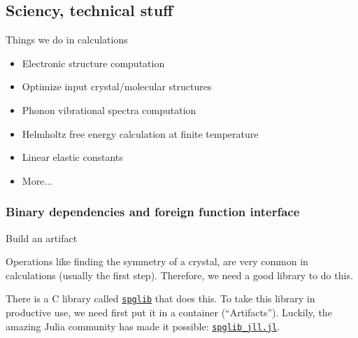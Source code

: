 \subsection{Sciency, technical stuff}

\begin{frame}{Things we do in \ab{} calculations}
    \begin{itemize}
        \item Electronic structure computation
        \item Optimize input crystal/molecular structures
        \item Phonon vibrational spectra computation
        \item Helmholtz free energy calculation at finite temperature
        \item Linear elastic constants
        \item More...
    \end{itemize}
\end{frame}

\subsubsection{Binary dependencies and foreign function interface}

\begin{frame}{Build an artifact}

    Operations like finding the symmetry of a crystal,
    are very common in \ab{} calculations (usually the first step).
    Therefore, we need a good library to do this.

    There is a C library called \href{https://github.com/spglib/spglib}{\texttt{spglib}}
    that does this.
    To take this library in productive use, we need first put it in a container
    (``Artifacts''). Luckily, the amazing Julia community has made it possible:
    \href{https://github.com/JuliaBinaryWrappers/spglib_jll.jl}{\texttt{spglib_jll.jl}}.

\end{frame}

